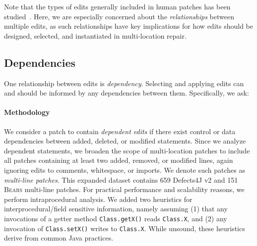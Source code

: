 \documentclass[10pt, conference]{IEEEtran}
\newcommand\bears{\textsc{Bears}\xspace}
\begin{document}
Note that the types of edits generally included in human patches has been
studied~\cite{zhong2015,soto}.  Here, we are especially
concerned about the 
\emph{relationships} between multiple edits, as such relationships have
key implications for how edits should be designed, selected, and instantiated 
in multi-location repair. 

\subsection{Dependencies}

One relationship between edits is
\emph{dependency}. Selecting and applying edits can
and should be informed by any dependencies between them.  Specifically, we ask:


\paragraph{Methodology}
We consider a patch to contain \emph{dependent edits} if there exist 
control or data dependencies between added, deleted, or modified statements.
Since we analyze dependent statements, we broaden the scope of multi-location patches to 
include all patches containing at least two added, removed, or modified lines, 
again ignoring edits to comments, whitespace, or imports.
We denote such patches as \emph{multi-line patches}.
This expanded dataset contains 659 Defects4J v2 and 151 \bears 
multi-line patches.
For practical performance and scalability reasons, 
we perform intraprocedural analysis. We added two heuristics for
interprocedural/field sensitive
information, namely assuming (1) that any invocations of a getter
method  \texttt{Class.getX()} reads \texttt{Class.X}, and (2) any invocation of 
 \texttt{Class.setX()} writes to  \texttt{Class.X}.
%
While unsound, these heuristics derive from common Java
practices.
\end{document}
